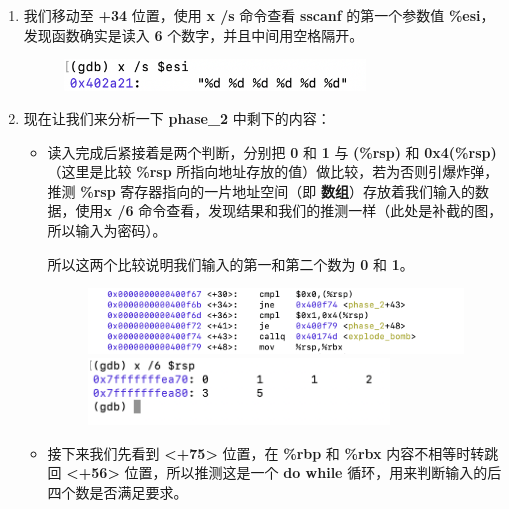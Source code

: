 \begin{enumerate}
\begin{figure}[htbp]
                \end{figure}
            \newpage
            \item 我们移动至 \textbf{+34} 位置，使用 \textbf{x /s } 命令查看 \textbf{sscanf} 的第一个参数值 \textbf{\%esi}，发现函数确实是读入 \textbf{6} 个数字，并且中间用空格隔开。
                \begin{figure}[htbp]
                    \hspace*{2cm}
                    \includegraphics*[width = 8cm]{s2_2.png}
                \end{figure}
            \item 现在让我们来分析一下 \textbf{phase\_2} 中剩下的内容：
                \begin{itemize}
                    \item 读入完成后紧接着是两个判断，分别把 \textbf{0} 和 \textbf{1} 与 \textbf{(\%rsp)} 和 \textbf{0x4(\%rsp)}（这里是比较 \textbf{\%rsp} 所指向地址存放的值）做比较，若为否则引爆炸弹，推测 \textbf{\%rsp} 寄存器指向的一片地址空间（即 \textbf{数组}）存放着我们输入的数据，使用\textbf{x /6 } 命令查看，发现结果和我们的推测一样（此处是补截的图，所以输入为密码）。
                        \par 所以这两个比较说明我们输入的第一和第二个数为 \textbf{0} 和 \textbf{1}。
                        \begin{figure}[htbp]
                            \hspace*{1.5cm}
                            \includegraphics*[width = 11cm]{s2_4.png} \\
                            \hspace*{2cm}
                            \includegraphics*[width = 8cm]{s2_3.png}
                        \end{figure}
                    \item 接下来我们先看到 \textbf{<+75>} 位置，在 \textbf{\%rbp} 和 \textbf{\%rbx} 内容不相等时转跳回 \textbf{<+56>} 位置，所以推测这是一个 \textbf{do while} 循环，用来判断输入的后四个数是否满足要求。

\end{itemize}
\end{enumerate}
